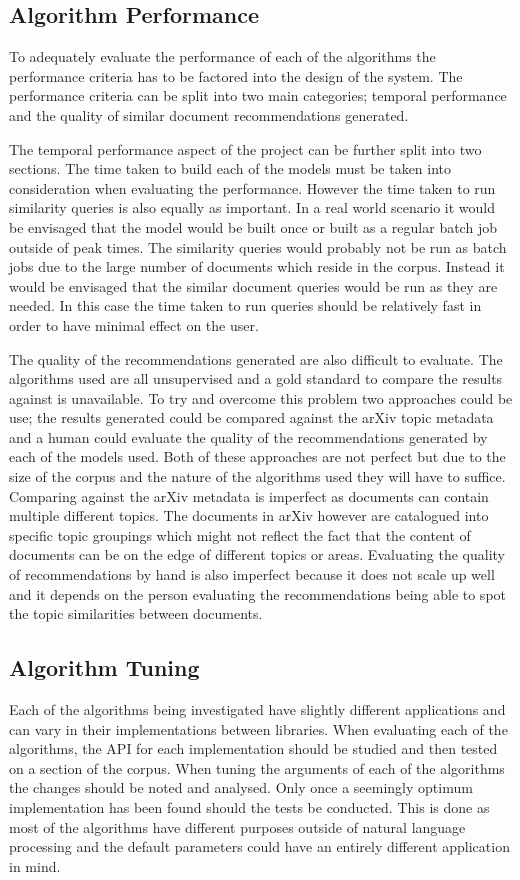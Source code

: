 \subsection{Algorithm Performance}
To adequately evaluate the performance of each of the algorithms the performance criteria has to be factored into the design of the system.
The performance criteria can be split into two main categories; temporal performance and the quality of similar document recommendations generated.

The temporal performance aspect of the project can be further split into two sections.
The time taken to build each of the models must be taken into consideration when evaluating the performance.
However the time taken to run similarity queries is also equally as important.
In a real world scenario it would be envisaged that the model would be built once or built as a regular batch job outside of peak times.
The similarity queries would probably not be run as batch jobs due to the large number of documents which reside in the corpus.
Instead it would be envisaged that the similar document queries would be run as they are needed.
In this case the time taken to run queries should be relatively fast in order to have minimal effect on the user.

The quality of the recommendations generated are also difficult to evaluate.
The algorithms used are all unsupervised and a gold standard to compare the results against is unavailable.
To try and overcome this problem two approaches could be use; the results generated could be compared against the arXiv topic metadata and a human could evaluate the quality of the recommendations generated by each of the models used.
Both of these approaches are not perfect but due to the size of the corpus and the nature of the algorithms used they will have to suffice.
Comparing against the arXiv metadata is imperfect as documents can contain multiple different topics.
The documents in arXiv however are catalogued into specific topic groupings which might not reflect the fact that the content of documents can be on the edge of different topics or areas.
Evaluating the quality of recommendations by hand is also imperfect because it does not scale up well and it depends on the person evaluating the recommendations being able to spot the topic similarities between documents.

\subsection{Algorithm Tuning}
Each of the algorithms being investigated have slightly different applications and can vary in their implementations between libraries.
When evaluating each of the algorithms, the API for each implementation should be studied and then tested on a section of the corpus.
When tuning the arguments of each of the algorithms the changes should be noted and analysed.
Only once a seemingly optimum implementation has been found should the tests be conducted.
This is done as most of the algorithms have different purposes outside of natural language processing and the default parameters could have an entirely different application in mind.


